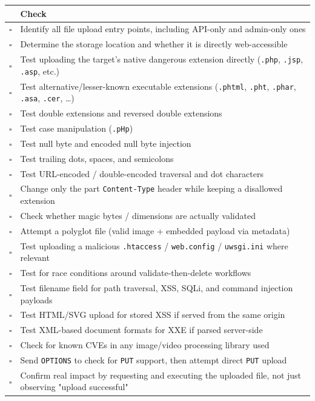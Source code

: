 \documentclass[11pt]{article}
\begin{document}
\begin{tabularx}{\linewidth}{@{}p{0.6cm}X@{}}
\toprule
 & \textbf{Check} \\
\midrule
$\square$ & Identify all file upload entry points, including API-only and admin-only ones \\
$\square$ & Determine the storage location and whether it is directly web-accessible \\
$\square$ & Test uploading the target's native dangerous extension directly (\texttt{.php}, \texttt{.jsp}, \texttt{.asp}, etc.) \\
$\square$ & Test alternative/lesser-known executable extensions (\texttt{.phtml}, \texttt{.pht}, \texttt{.phar}, \texttt{.asa}, \texttt{.cer}, \dots) \\
$\square$ & Test double extensions and reversed double extensions \\
$\square$ & Test case manipulation (\texttt{.pHp}) \\
$\square$ & Test null byte and encoded null byte injection \\
$\square$ & Test trailing dots, spaces, and semicolons \\
$\square$ & Test URL-encoded / double-encoded traversal and dot characters \\
$\square$ & Change only the part \texttt{Content-Type} header while keeping a disallowed extension \\
$\square$ & Check whether magic bytes / dimensions are actually validated \\
$\square$ & Attempt a polyglot file (valid image + embedded payload via metadata) \\
$\square$ & Test uploading a malicious \texttt{.htaccess} / \texttt{web.config} / \texttt{uwsgi.ini} where relevant \\
$\square$ & Test for race conditions around validate-then-delete workflows \\
$\square$ & Test filename field for path traversal, XSS, SQLi, and command injection payloads \\
$\square$ & Test HTML/SVG upload for stored XSS if served from the same origin \\
$\square$ & Test XML-based document formats for XXE if parsed server-side \\
$\square$ & Check for known CVEs in any image/video processing library used \\
$\square$ & Send \texttt{OPTIONS} to check for \texttt{PUT} support, then attempt direct \texttt{PUT} upload \\
$\square$ & Confirm real impact by requesting and executing the uploaded file, not just observing "upload successful" \\
\bottomrule
\end{tabularx}
\end{document}

